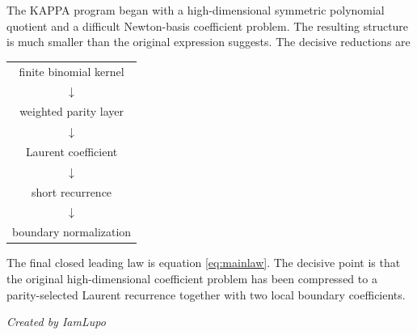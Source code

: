 \documentclass[11pt]{article}
\theoremstyle{remark}
\theoremstyle{definition}
\begin{document}
The KAPPA program began with a high-dimensional symmetric polynomial quotient
and a difficult Newton-basis coefficient problem.  The resulting structure is
much smaller than the original expression suggests.  The decisive reductions
are
\begin{center}
\begin{tabular}{c}
finite binomial kernel\\
$\downarrow$\\
weighted parity layer\\
$\downarrow$\\
Laurent coefficient\\
$\downarrow$\\
short recurrence\\
$\downarrow$\\
boundary normalization
\end{tabular}
\end{center}
The final closed leading law is equation \eqref{eq:mainlaw}.  The decisive
point is that the original high-dimensional coefficient problem has been
compressed to a parity-selected Laurent recurrence together with two local
boundary coefficients.

\vfill
\begin{center}
\textit{Created by IamLupo}
\end{center}
\end{document}
